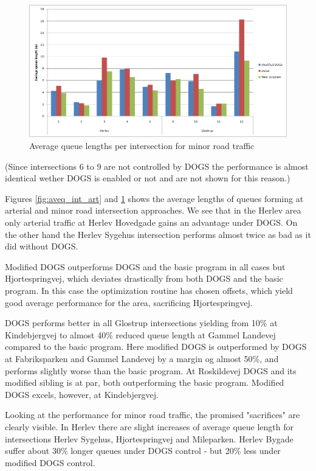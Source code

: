 \begin{figure}[ht]
\centering
\includegraphics[scale=0.30]{aveq_intersection_crossing.png}
\caption{Average queue lengths per intersection for minor road traffic}
\label{fig:aveq_int_cross}
\end{figure}

(Since intersections 6 to 9 are not controlled by DOGS the performance is almost identical wether DOGS is enabled or not and are not shown for this reason.)

Figures \ref{fig:aveq_int_art} and \ref{fig:aveq_int_cross} shows the average lengths of queues forming at arterial and  minor road intersection approaches. We see that in the Herlev area only arterial traffic at Herlev Hovedgade gains an advantage under DOGS. On the other hand the Herlev Sygehus intersection performs almost twice as bad as it did without DOGS.

Modified DOGS outperforms DOGS and the basic program in all cases but Hjortespringvej, which deviates drastically from both DOGS and the basic program. In this case the optimization routine has chosen offsets, which yield good average performance for the area, sacrificing Hjortespringvej.

DOGS performs better in all Glostrup intersections yielding from 10\% at Kindebjergvej to almost 40\% reduced queue length at Gammel Landevej compared to the basic program. Here modified DOGS is outperformed by DOGS at Fabriksparken and Gammel Landevej by a margin og almost 50\%, and performs slightly worse than the basic program. At Roskildevej DOGS and its modified sibling is at par, both outperforming the basic program. Modified DOGS excels, however, at Kindebjergvej.

Looking at the performance for minor road traffic, the promised "sacrifices" are clearly visible. In Herlev there are slight increases of average queue length for intersections Herlev Sygehus, Hjortespringvej and Mileparken. Herlev Bygade suffer about 30\% longer queues under DOGS control - but 20\% less under modified DOGS control.

